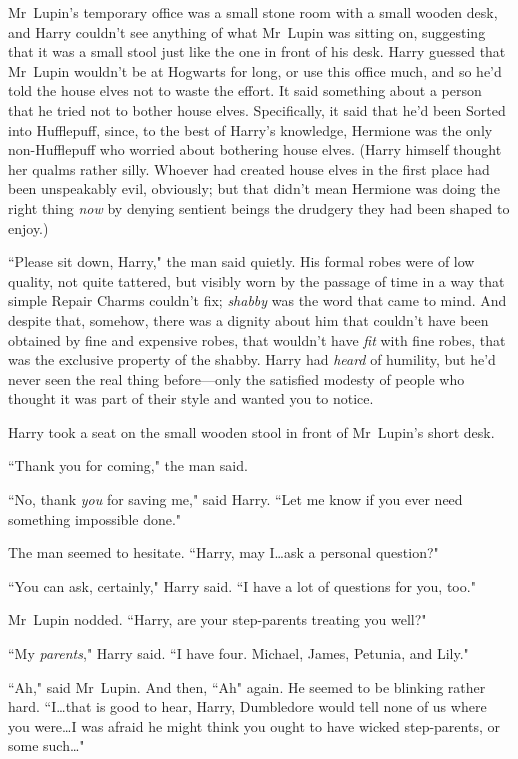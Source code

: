 \later

Mr~Lupin's temporary office was a small stone room with a small wooden desk, and Harry couldn't see anything of what Mr~Lupin was sitting on, suggesting that it was a small stool just like the one in front of his desk. Harry guessed that Mr~Lupin wouldn't be at Hogwarts for long, or use this office much, and so he'd told the house elves not to waste the effort. It said something about a person that he tried not to bother house elves. Specifically, it said that he'd been Sorted into Hufflepuff, since, to the best of Harry's knowledge, Hermione was the only non-Hufflepuff who worried about bothering house elves. (Harry himself thought her qualms rather silly. Whoever had created house elves in the first place had been unspeakably evil, obviously; but that didn't mean Hermione was doing the right thing \emph{now} by denying sentient beings the drudgery they had been shaped to enjoy.)

``Please sit down, Harry," the man said quietly. His formal robes were of low quality, not quite tattered, but visibly worn by the passage of time in a way that simple Repair Charms couldn't fix; \emph{shabby} was the word that came to mind. And despite that, somehow, there was a dignity about him that couldn't have been obtained by fine and expensive robes, that wouldn't have \emph{fit} with fine robes, that was the exclusive property of the shabby. Harry had \emph{heard} of humility, but he'd never seen the real thing before—only the satisfied modesty of people who thought it was part of their style and wanted you to notice.

Harry took a seat on the small wooden stool in front of Mr~Lupin's short desk.

``Thank you for coming," the man said.

``No, thank \emph{you} for saving me," said Harry. ``Let me know if you ever need something impossible done."

The man seemed to hesitate. ``Harry, may I…ask a personal question?"

``You can ask, certainly," Harry said. ``I have a lot of questions for you, too."

Mr~Lupin nodded. ``Harry, are your step-parents treating you well?"

``My \emph{parents}," Harry said. ``I have four. Michael, James, Petunia, and Lily."

``Ah," said Mr~Lupin. And then, ``Ah" again. He seemed to be blinking rather hard. ``I…that is good to hear, Harry, Dumbledore would tell none of us where you were…I was afraid he might think you ought to have wicked step-parents, or some such…"

